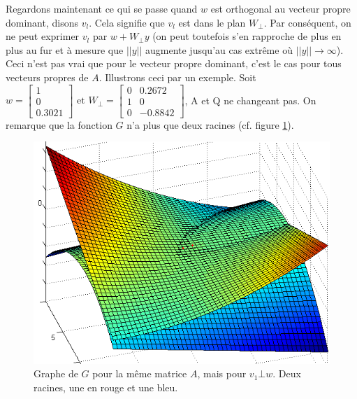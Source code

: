 Regardons maintenant ce qui se passe quand $w$ est orthogonal au vecteur propre dominant, disons $v_l$. Cela signifie que $v_l$ est dans le plan $W_{\bot}$. Par conséquent, on ne peut exprimer $v_l$ par $w+W_{\bot}y$ (on peut toutefois s'en rapproche de plus en plus au fur et à mesure que $||y||$ augmente jusqu'au cas extrême où $||y|| \rightarrow \infty$).\\
Ceci n'est pas vrai que pour le vecteur propre dominant, c'est le cas pour tous vecteurs propres de $A$. Illustrons ceci par un exemple.
Soit $w = 
\begin{bmatrix}
1 \\
0\\
0.3021
\end{bmatrix} \text{ et } 
W_{\bot} =  
\begin{bmatrix}
0 & 0.2672 \\
1 & 0 \\
0 & -0.8842 
\end{bmatrix}$, A et Q ne changeant pas. On remarque que la fonction $G$ n'a plus que deux racines (cf. figure \ref{FigNewtonv1inW}).

\begin{figure}
\centering
\includegraphics[width=12cm]{grapheG3.png}
\caption{Graphe de $G$ pour la même matrice $A$, mais pour $v_1 \bot w$. Deux racines, une en rouge et une bleu.}
\label{FigNewtonv1inW}
\end{figure}


